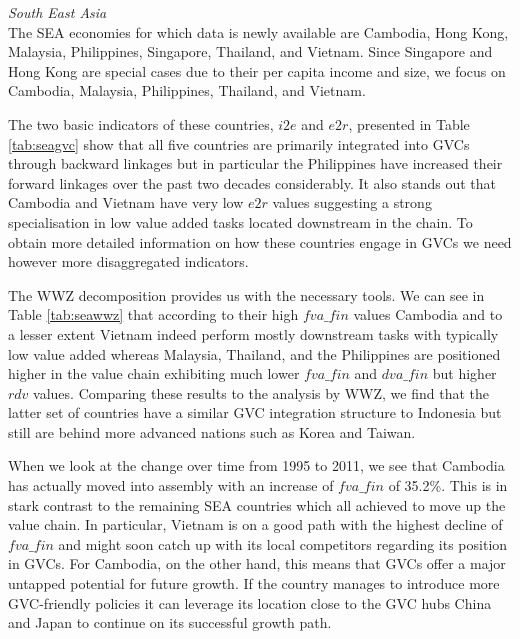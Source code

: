 \documentclass[11pt,a4paper]{article}
\begin{document}
\textit{South East Asia}\\
The SEA economies for which data is newly available are Cambodia, Hong Kong, Malaysia, Philippines, Singapore, Thailand, and Vietnam. Since Singapore and Hong Kong are special cases due to their per capita income and size, we focus on Cambodia, Malaysia, Philippines, Thailand, and Vietnam. 

The two basic indicators of these countries, $i2e$ and $e2r$, presented in Table \ref{tab:seagvc} show that all five countries are primarily integrated into GVCs through backward linkages but in particular the Philippines have increased their forward linkages over the past two decades considerably. It also stands out that Cambodia and Vietnam have very low $e2r$ values suggesting a strong specialisation in low value added tasks located downstream in the chain. To obtain more detailed information on how these countries engage in GVCs we need however more disaggregated indicators.

The WWZ decomposition provides us with the necessary tools. We can see in Table \ref{tab:seawwz} that according to their high $fva\_fin$ values Cambodia and to a lesser extent Vietnam indeed perform mostly downstream tasks with typically low value added whereas Malaysia, Thailand, and the Philippines are positioned higher in the value chain exhibiting much lower $fva\_fin$ and $dva\_fin$ but higher $rdv$ values. Comparing these results to the analysis by WWZ, we find that the latter set of countries have a similar GVC integration structure to Indonesia but still are behind more advanced nations such as Korea and Taiwan. 

When we look at the change over time from 1995 to 2011, we see that Cambodia has actually moved into assembly with an increase of $fva\_fin$ of 35.2\%. This is in stark contrast to the remaining SEA countries which all achieved to move up the value chain. In particular, Vietnam is on a good path with the highest decline of $fva\_fin$ and might soon catch up with its local competitors regarding its position in GVCs. For Cambodia, on the other hand, this means that GVCs offer a major untapped potential for future growth. If the country manages to introduce more GVC-friendly policies it can leverage its location close to the GVC hubs China and Japan to continue on its successful growth path.\\
\end{document}
